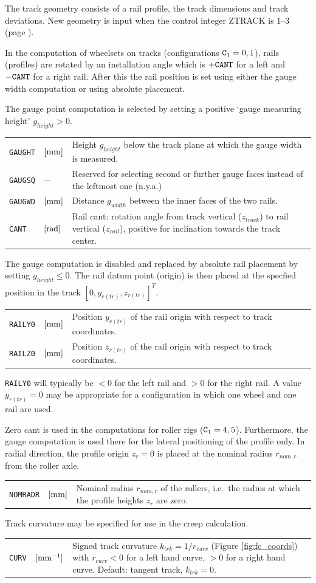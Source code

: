 \documentclass[12pt]{report}
\newenvironment{inputvars}{\vspace{0.4\baselineskip}%

\begin{tabular}{>{\raggedright}p{22mm}p{19mm}p{113mm}}}{
\end{tabular}

}
\newcommand{\inpvar}[3]{{\small\tt #1} & $#2$ & #3 \\[1ex]}
\begin{document}
The track geometry consists of a rail profile, the track dimensions
and track deviations. New geometry is input when the control integer
ZTRACK is 1--3 (page \pageref{z1-digit}).

In the computation of wheelsets on tracks (configurations ${\tt C}_1=0,
1$), rails (profiles) are rotated by an installation angle which is $+{\tt
CANT}$ for a left and $-{\tt CANT}$ for a right rail. 
After this the rail position is set using either the gauge width
computation or using absolute placement.

The gauge point computation is selected by setting a positive 
`gauge measuring height' $g_{height}>0$.
\begin{inputvars}
\inpvar{GAUGHT}{\bunit{mm}}{Height $g_{height}$ below the track plane at which
        the gauge width is measured.}
\inpvar{GAUGSQ}{-}{Reserved for selecting second or further gauge faces
        instead of the leftmost one (n.y.a.)}
\inpvar{GAUGWD}{\bunit{mm}}{Distance $g_{width}$ between the inner faces of the
        two rails.}
\inpvar{CANT}{\bunit{rad}}{Rail cant: rotation angle from track vertical
        ($z_{track}$) to rail vertical ($z_{rail}$), positive for
        inclination towards the track center.}
\end{inputvars}
The gauge computation is disabled and replaced by absolute rail placement
by setting $g_{height}\le 0$. The rail datum point (origin) is then placed
at the specfied position in the track $[0, y_{r(tr)}, z_{r(tr)}]^T$. 
\begin{inputvars}
\inpvar{RAILY0}{\bunit{mm}}{Position $y_{r(tr)}$ of the rail origin with
        respect to track coordinates.}
\inpvar{RAILZ0}{\bunit{mm}}{Position $z_{r(tr)}$ of the rail origin with
        respect to track coordinates.}
\end{inputvars}
{\tt RAILY0} will typically be $<0$ for the left rail and $>0$ for
the right rail. A value $y_{r(tr)}=0$ may be appropriate for a
configuration in which one wheel and one rail are used.

Zero cant is used in the computations for roller rigs (${\tt C}_1=4,5$).
Furthermore, the gauge computation is used there for the lateral
positioning of the profile only. In radial direction, the profile origin
$z_r=0$ is placed at the nominal radius $r_{nom,r}$ from the roller axle.
\begin{inputvars}
\inpvar{NOMRADR}{\bunit{mm}}{Nominal radius $r_{nom,r}$ of the rollers,
        i.e.\ the radius at which the profile heights $z_r$ are zero.}
\end{inputvars}
Track curvature may be specified for use in the creep calculation.
\begin{inputvars}
\inpvar{CURV}{\bunit{mm^{-1}}}{Signed track curvature $k_{trk}=1/r_{curv}$
        (Figure \ref{fig:fc_coords}) with $r_{curv}<0$ for a left hand
        curve, $>0$ for a right hand curve. Default: tangent track,
        $k_{trk}=0$.}
\end{inputvars}
\end{document}
